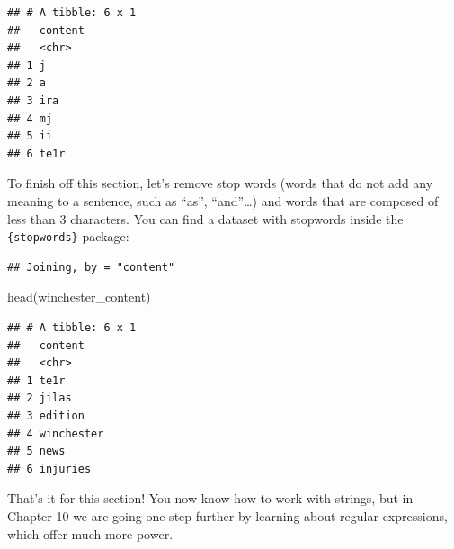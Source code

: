 \documentclass[
]{article}
\newenvironment{Shaded}{\begin{snugshade}}{\end{snugshade}}
\newcommand{\DecValTok}[1]{\textcolor[rgb]{0.00,0.00,0.81}{#1}}
\newcommand{\FunctionTok}[1]{\textcolor[rgb]{0.00,0.00,0.00}{#1}}
\newcommand{\NormalTok}[1]{#1}
\newcommand{\OtherTok}[1]{\textcolor[rgb]{0.56,0.35,0.01}{#1}}
\newcommand{\SpecialCharTok}[1]{\textcolor[rgb]{0.00,0.00,0.00}{#1}}
\newcommand{\StringTok}[1]{\textcolor[rgb]{0.31,0.60,0.02}{#1}}
\begin{document}
\begin{verbatim}
## # A tibble: 6 x 1
##   content
##   <chr>  
## 1 j      
## 2 a      
## 3 ira    
## 4 mj     
## 5 ii     
## 6 te1r
\end{verbatim}

To finish off this section, let's remove stop words (words that do not add any meaning to a sentence,
such as ``as'', ``and''\ldots) and words that are composed of less than 3 characters. You can find a dataset
with stopwords inside the \texttt{\{stopwords\}} package:

\begin{Shaded}
\end{Shaded}

\begin{verbatim}
## Joining, by = "content"
\end{verbatim}

\begin{Shaded}
\begin{Highlighting}[]
\FunctionTok{head}\NormalTok{(winchester\_content)}
\end{Highlighting}
\end{Shaded}

\begin{verbatim}
## # A tibble: 6 x 1
##   content   
##   <chr>     
## 1 te1r      
## 2 jilas     
## 3 edition   
## 4 winchester
## 5 news      
## 6 injuries
\end{verbatim}

That's it for this section! You now know how to work with strings, but in Chapter 10 we are going
one step further by learning about regular expressions, which offer much more power.
\end{document}
